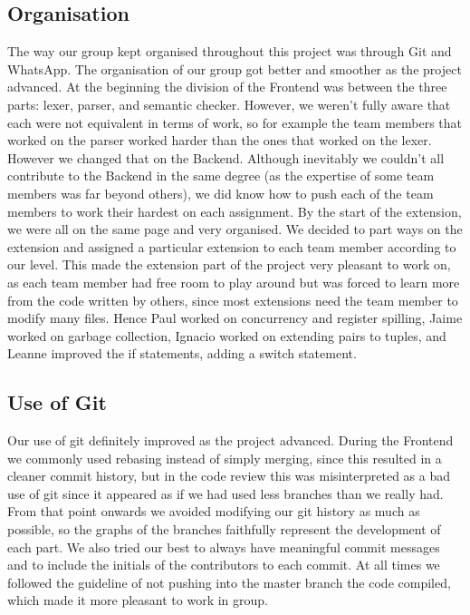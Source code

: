 \documentclass{article}
\begin{document}
\subsection{Organisation}
The way our group kept organised throughout this project was through Git and WhatsApp. The organisation of our group got better and smoother as the project advanced. At the beginning the division of the Frontend was between the three parts: lexer, 
parser, and semantic checker. However, we weren't fully aware that each were not equivalent in terms of work, so for example the team members that worked on the parser worked harder than the ones that worked on the lexer. However we changed that on the Backend. Although inevitably we couldn't all contribute to the Backend in the same degree (as the expertise of some team members was far beyond others), we did know how to push each of the team members to work their hardest on each assignment. By the start of the extension, we were all on the same page and very organised. We decided to part ways on the extension and assigned a particular extension to each team member according to our level. This made the extension part of the project very pleasant to work on, as each team member had 
free room to play around but was forced to learn more from the code written by others, since most extensions need the team member to modify many files. Hence Paul worked on concurrency and register spilling, Jaime worked on garbage collection, Ignacio worked on extending pairs to tuples, and Leanne improved the if statements, adding a switch statement. 

\subsection{Use of Git}
Our use of git definitely improved as the project advanced. During the Frontend we commonly used rebasing instead of simply merging, since this resulted in a cleaner commit history, but in the code review this was misinterpreted as a bad use of git since it appeared as if we had used less branches than we really had. From that point onwards we avoided modifying our git history as much as possible, so the graphs of the branches faithfully represent the development of each part. We also tried our best to always have meaningful commit messages and to include the initials of the contributors to each commit. At all times we followed the guideline of not pushing into the master branch the code compiled, which made it more pleasant to work in group. 
\end{document}
